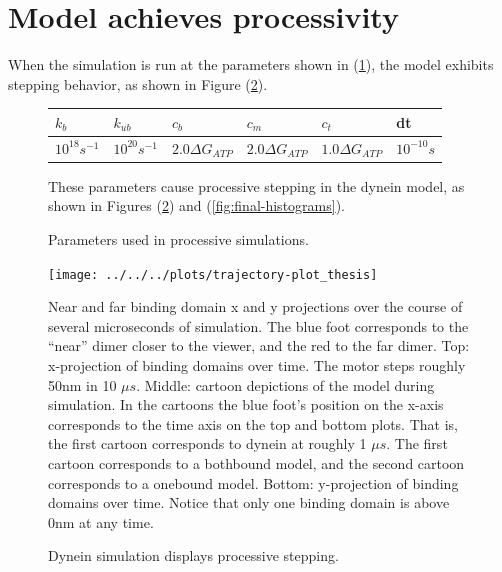 \documentclass[
11pt, %
english, %
singlespacing, %
headsepline, %
chapterinoneline, %
]{MastersDoctoralThesis} %
\begin{document}

\section{Model achieves processivity}
When the simulation is run at the parameters shown in (\ref{table:thesis-parameters}), the model exhibits stepping behavior, as shown in Figure (\ref{fig:stepping-trajectory}).\\

\begin{figure}[h]
  \centering
  \begin{tabular}{| l | l | l | l | l | l |}
    \hline
    $k_{b}$ & $k_{ub}$ & $c_b$ &  $c_m$ & $c_t$ & dt\\\hline
    $10^{18} s^{-1}$ & $10^{20} s^{-1}$ & $2.0\Delta G_{ATP}$ & $2.0\Delta G_{ATP}$ & $1.0\Delta G_{ATP}$ & $10^{-10}s$\\ \hline
  \end{tabular}
  \caption{Parameters used in processive simulations.}{These parameters cause processive stepping in the dynein model, as shown in Figures (\ref{fig:stepping-trajectory}) and (\ref{fig:final-histograms}).}
  \label{table:thesis-parameters}
\end{figure}

\begin{figure}[h]
  \centering
  \texttt{[image: ../../../plots/trajectory-plot\_thesis]}
  \caption{Dynein simulation displays processive stepping.}{Near and far binding domain x and y projections over the course of several microseconds of simulation. The blue foot corresponds to the ``near'' dimer closer to the viewer, and the red to the far dimer. Top: x-projection of binding domains over time. The motor steps roughly 50nm in 10 $\mu s$. Middle: cartoon depictions of the model during simulation. In the cartoons the blue foot's position on the x-axis corresponds to the time axis on the top and bottom plots. That is, the first cartoon corresponds to dynein at roughly 1 $\mu s$. The first cartoon corresponds to a bothbound model, and the second cartoon corresponds to a onebound model. Bottom: y-projection of binding domains over time. Notice that only one binding domain is above 0nm at any time.}
  \label{fig:stepping-trajectory}
\end{figure}
\end{document}
